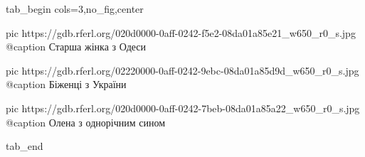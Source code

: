  
 
 
 
 


\ifcmt
  tab_begin cols=3,no_fig,center

     pic https://gdb.rferl.org/020d0000-0aff-0242-f5e2-08da01a85e21_w650_r0_s.jpg
		 @caption Старша жінка з Одеси

		 pic https://gdb.rferl.org/02220000-0aff-0242-9ebc-08da01a85d9d_w650_r0_s.jpg
		 @caption Біженці з України

		 pic https://gdb.rferl.org/020d0000-0aff-0242-7beb-08da01a85a22_w650_r0_s.jpg
		 @caption Олена з однорічним сином

  tab_end
\fi

